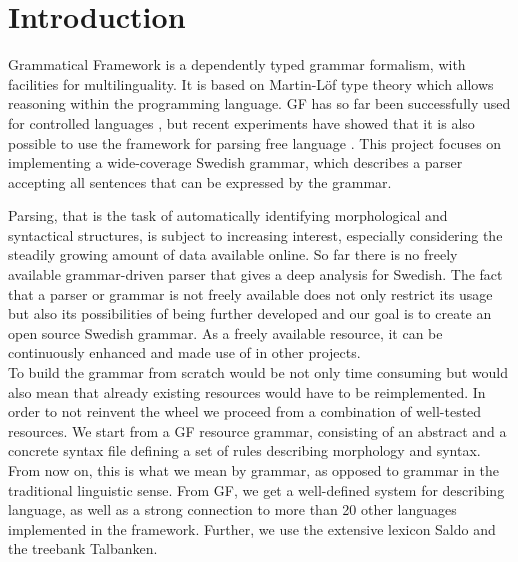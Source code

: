 \documentclass{report}
\begin{document}
\newpage
\tableofcontents
%
\newpage
\setcounter{page}{1} %
\chapter{Introduction}
Grammatical Framework \cite{gfbok} is a dependently typed grammar formalism,
with facilities for multilinguality. It is based on Martin-Löf type theory which allows
reasoning within the programming language.
GF has so far been successfully used for 
controlled languages \cite{cnl}, but recent experiments have showed
that it is also possible to use the framework for parsing free language \cite{patent}.
This project focuses on implementing a wide-coverage Swedish grammar, which
describes a parser accepting all sentences that can be expressed by the grammar.

Parsing, that is the task of automatically identifying morphological and
syntactical structures, is subject to increasing interest, especially
considering the steadily growing amount of data available online. 
So far there is no freely available grammar-driven parser that gives a deep
analysis for Swedish. The fact that %
a parser or grammar is not freely available does not only restrict its
usage but also its possibilities of being further developed and our
goal is
to create an open source Swedish grammar. %
As a freely available resource, it can be continuously enhanced and
made use of in other projects.\\
To build the grammar from scratch would be not only time consuming but
would also mean that already existing resources would have to be reimplemented.
In order to not reinvent the wheel we proceed from a combination of well-tested
resources.
We start from a GF resource grammar, consisting of an abstract and a concrete syntax
file defining a set of rules describing morphology and syntax.
From now on, this is what we mean by grammar, as
opposed to grammar in the traditional linguistic sense. 
From GF, we get %
a well-defined system for describing language, as well as a strong connection to
more than 20 other languages implemented in the framework. Further, we use
the extensive lexicon Saldo and the treebank Talbanken.
\end{document}

